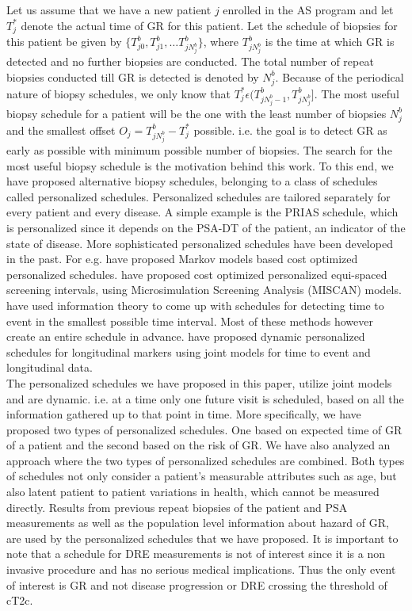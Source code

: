 Let us assume that we have a new patient $j$ enrolled in the AS program and let $T_j^*$ denote the actual time of GR for this patient. Let the schedule of biopsies for this patient be given by $\{T^b_{j0}, T^b_{j1}, \ldots T^b_{j{N_j^b}}\}$, where $T^b_{j{N_j^b}}$ is the time at which GR is detected and no further biopsies are conducted. The total number of repeat biopsies conducted till GR is detected is denoted by $N_j^b$. Because of the periodical nature of biopsy schedules, we only know that $T^*_j \epsilon (T^b_{j{N_j^b - 1}}, T^b_{j{N_j^b}}]$. The most useful biopsy schedule for a patient will be the one with the least number of biopsies $N_j^b$ and the smallest offset $O_j = T^b_{j{N_j^b}} - T_j^*$ possible. i.e. the goal is to detect GR as early as possible with minimum possible number of biopsies. The search for the most useful biopsy schedule is the motivation behind this work. To this end, we have proposed alternative biopsy schedules, belonging to a class of schedules called personalized schedules. Personalized schedules are tailored separately for every patient and every disease. A simple example is the PRIAS schedule, which is personalized since it depends on the PSA-DT of the patient, an indicator of the state of disease. More sophisticated personalized schedules have been developed in the past. For e.g. \cite{bebu2017OptimalScreening} have proposed Markov models based cost optimized personalized schedules. \cite{oMahonyOptimaInterval} have proposed cost optimized personalized equi-spaced screening intervals, using Microsimulation Screening Analysis (MISCAN) models. \cite{parmigiani1998designing} have used information theory to come up with schedules for detecting time to event in the smallest possible time interval. Most of these methods however create an entire schedule in advance. \cite{drizopoulosPersScreening} have proposed dynamic personalized schedules for longitudinal markers using joint models for time to event and longitudinal data\citep{tsiatis2004joint,rizopoulos2012joint}.\\

The personalized schedules we have proposed in this paper, utilize joint models and are dynamic. i.e. at a time only one future visit is scheduled, based on all the information gathered up to that point in time. More specifically, we have proposed two types of personalized schedules. One based on expected time of GR of a patient and the second based on the risk of GR. We have also analyzed an approach where the two types of personalized schedules are combined. Both types of schedules not only consider a patient's measurable attributes such as age, but also latent patient to patient variations in health, which cannot be measured directly. Results from previous repeat biopsies of the patient and PSA measurements as well as the population level information about hazard of GR, are used by the personalized schedules that we have proposed. It is important to note that a schedule for DRE measurements is not of interest since it is a non invasive procedure and has no serious medical implications. Thus the only event of interest is GR and not disease progression or DRE crossing the threshold of cT2c.\\

